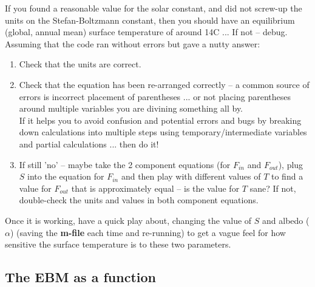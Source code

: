 \documentclass{tufte-book} %
\begin{document}
If you found a reasonable value for the solar constant, and did not screw-up the units on the Stefan-Boltzmann constant, then you should have an equilibrium (global, annual mean) surface temperature of around 14\degree C ... If not -- debug. Assuming that the code ran without errors but gave a nutty answer:
\begin{enumerate}[noitemsep]
\setlength{\itemindent}{.2in}
\item Check that the units are correct.
\item Check that the equation has been re-arranged correctly -- a common source of errors is incorrect placement of parentheses ... or not placing parentheses around multiple variables you are divining something all by.
\\ If it helps you to avoid confusion and potential errors and bugs by breaking down calculations into multiple steps using temporary/intermediate variables and partial calculations ... then do it!
\item If still 'no' -- maybe take the 2 component equations (for \(F_{in}\) and \(F_{out}\)), plug \(S\) into the equation for \(F_{in}\) and then play with different values of \(T\) to find a value for \(F_{out}\) that is approximately equal -- is the value for \(T\) sane? If not, double-check the units and values in both component equations.
\end{enumerate} 

Once it is working, have a quick play about, changing the value of \(S\) and albedo (\(\alpha\)) (saving the \textbf{m-file} each time and re-running) to get a vague feel for how sensitive the surface temperature is to these two parameters.


\subsection{The EBM as a function}
\end{document}
